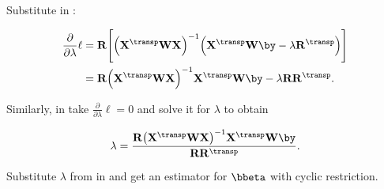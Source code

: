 \noindent Substitute  in :

\begin{align}
  \frac{\partial}{\partial \lambda} \ell
  &=
    \mathbf{R}
    \Biggl[
    \Bigl(
    \mathbf{X}^\transp
    \mathbf{W}
    \mathbf{X}
    \Bigr)^{-1}
    \Bigl(
    \mathbf{X}^\transp
    \mathbf{W}
    \by
    -
    \lambda
    \mathbf{R}^\transp
    \Bigr)
    \Biggr] \nonumber \\
  &=
    \mathbf{R}
    \Bigl(
    \mathbf{X}^\transp
    \mathbf{W}
    \mathbf{X}
    \Bigr)^{-1}
    \mathbf{X}^\transp
    \mathbf{W}
    \by
    -
    \lambda
    \mathbf{R}
    \mathbf{R}^\transp.
      \label{eq:lambdapresol}
\end{align}

Similarly, in  take $  \frac{\partial}{\partial \lambda} \ell = 0$ and solve it for $\lambda$ to obtain

\begin{equation}
  \label{eq:lambdasol}
  \lambda
  =
  \frac
  {    \mathbf{R}
    \bigl(
    \mathbf{X}^\transp
    \mathbf{W}
    \mathbf{X}
    \bigr)^{-1}
    \mathbf{X}^\transp
    \mathbf{W}
    \by}
  { \mathbf{R}\mathbf{R}^\transp}.
\end{equation}

Substitute $\lambda$ from  in  and get an estimator for $\bbeta$ with cyclic restriction.







